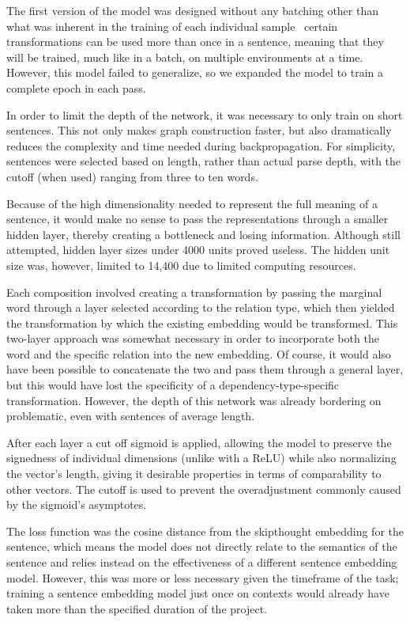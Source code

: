 \documentclass[11pt]{article}
\begin{document}
The first version of the model was designed without any batching other than what was inherent in the training of each individual sample \textemdash\ certain transformations can be used more than once in a sentence, meaning that they will be trained, much like in a batch, on multiple environments at a time. However, this model failed to generalize, so we expanded the model to train a complete epoch in each pass.

In order to limit the depth of the network, it was necessary to only train on short sentences. This not only makes graph construction faster, but also dramatically reduces the complexity and time needed during backpropagation. For simplicity, sentences were selected based on length, rather than actual parse depth, with the cutoff (when used) ranging from three to ten words.

Because of the high dimensionality needed to represent the full meaning of a sentence, it would make no sense to pass the representations through a smaller hidden layer, thereby creating a bottleneck and losing information. Although still attempted, hidden layer sizes under 4000 units proved useless. The hidden unit size was, however, limited to 14,400 due to limited computing resources.

Each composition involved creating a transformation by passing the marginal word through a layer selected according to the relation type, which then yielded the transformation by which the existing embedding would be transformed. This two-layer approach was somewhat necessary in order to incorporate both the word and the specific relation into the new embedding. Of course, it would also have been possible to concatenate the two and pass them through a general layer, but this would have lost the specificity of a dependency-type-specific transformation. However, the depth of this network was already bordering on problematic, even with sentences of average length.

After each layer a cut off sigmoid is applied, allowing the model to preserve the signedness of individual dimensions (unlike with a ReLU) while also normalizing the vector's length, giving it desirable properties in terms of comparability to other vectors. The cutoff is used to prevent the overadjustment commonly caused by the sigmoid's asymptotes.

The loss function was the cosine distance from the skipthought embedding for the sentence, which means the model does not directly relate to the semantics of the sentence and relies instead on the effectiveness of a different sentence embedding model. However, this was more or less necessary given the timeframe of the task; training a sentence embedding model just once on contexts would already have taken more than the specified duration of the project.
\end{document}
